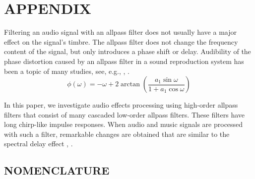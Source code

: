 \documentclass{aes2e}
\begin{document}
\appendix
\section*{APPENDIX}
Filtering an audio signal with an allpass filter does not usually have a major effect on the signal's timbre. The allpass filter does not change the frequency content of the signal, but only introduces a phase shift or delay. Audibility of the phase distortion caused by an allpass filter in a sound reproduction system has been a topic of many studies, see, e.g., \cite{DEK1}, \cite{DEK2}.
\begin{equation}
\phi (\omega ) =  - \omega  + 2\arctan \left( {\frac{{a_1 \sin \omega }}{{1 + a_1 \cos \omega }}} \right)
\end{equation}

In this paper, we investigate audio effects processing using high-order allpass filters that consist of many cascaded low-order allpass filters. These filters have long chirp-like impulse responses. When audio and music signals are processed with such a filter, remarkable changes are obtained that are similar to the spectral delay effect  \cite{DEK3}, \cite{DEK4}.


\begin{nomenclature}[PAMPs]
\subsection*{NOMENCLATURE}



\end{nomenclature}
\end{document}
